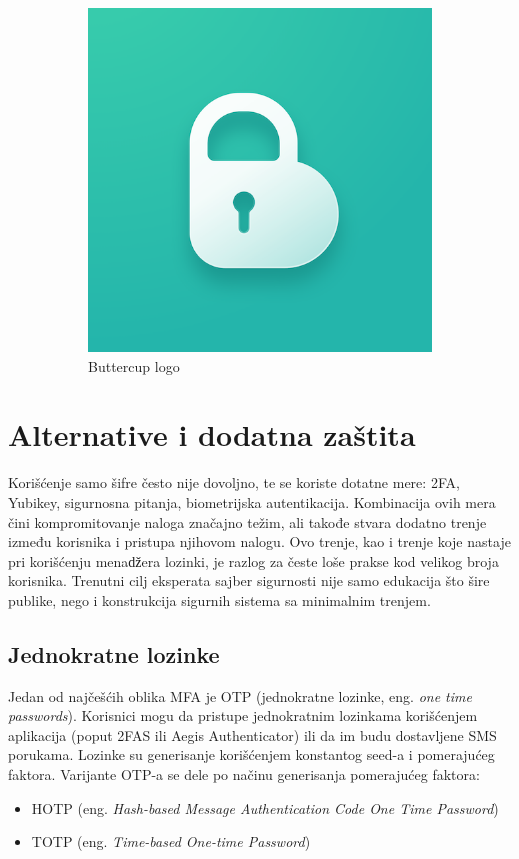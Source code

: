 \documentclass[fleqn, 12pt]{article}
\begin{document}
\begin{figure}[h]
\begin{subfigure}[b]{0.45\linewidth}
        \includegraphics[width=\linewidth]{buttercup_logo.png}
        \caption{Buttercup logo}
        \label{fig:image2}
    \end{subfigure}
    \caption{}
    \label{fig:side_by_side}
\end{figure}

\newpage
\section{Alternative i dodatna zaštita}
\indent Korišćenje samo šifre često nije dovoljno, te se koriste dotatne mere: 2FA, Yubikey, sigurnosna pitanja, biometrijska autentikacija. Kombinacija ovih mera čini kompromitovanje naloga značajno težim, ali takođe stvara dodatno trenje između korisnika i pristupa njihovom nalogu. Ovo trenje, kao i trenje koje nastaje pri korišćenju menaǆera lozinki, je razlog za česte loše prakse kod velikog broja korisnika. Trenutni cilj eksperata sajber sigurnosti nije samo edukacija što šire publike, nego i konstrukcija sigurnih sistema sa minimalnim trenjem. 

\subsection{Jednokratne lozinke}
Jedan od najčešćih oblika MFA je OTP (jednokratne lozinke, eng. \emph{one time passwords}). Korisnici mogu da pristupe jednokratnim lozinkama korišćenjem aplikacija (poput 2FAS ili Aegis Authenticator) ili da im budu dostavljene SMS porukama. Lozinke su generisanje korišćenjem konstantog seed-a i pomerajućeg faktora.\cite{OTP} Varijante OTP-a se dele po načinu generisanja pomerajućeg faktora:
\begin{itemize}
    \item HOTP (eng. \emph{Hash-based Message Authentication Code One Time Password})
    \item TOTP (eng. \emph{Time-based One-time Password})
\end{itemize}
\end{document}
